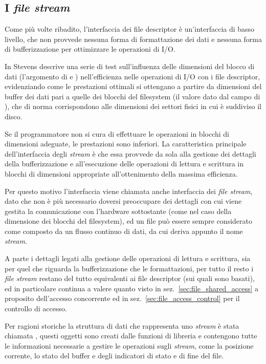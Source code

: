 \subsection{I \textit{file stream}}
\label{sec:file_stream}


Come più volte ribadito, l'interfaccia dei file descriptor è un'interfaccia di
basso livello, che non provvede nessuna forma di formattazione dei dati e
nessuna forma di bufferizzazione per ottimizzare le operazioni di I/O.

In \cite{APUE} Stevens descrive una serie di test sull'influenza delle
dimensioni del blocco di dati (l'argomento  di  e
) nell'efficienza nelle operazioni di I/O con i file descriptor,
evidenziando come le prestazioni ottimali si ottengano a partire da dimensioni
del buffer dei dati pari a quelle dei blocchi del filesystem (il valore dato
dal campo  di ), che di norma corrispondono alle
dimensioni dei settori fisici in cui è suddiviso il disco.

Se il programmatore non si cura di effettuare le operazioni in blocchi di
dimensioni adeguate, le prestazioni sono inferiori.  La caratteristica
principale dell'interfaccia degli \textit{stream} è che essa provvede da sola
alla gestione dei dettagli della bufferizzazione e all'esecuzione delle
operazioni di lettura e scrittura in blocchi di dimensioni appropriate
all'ottenimento della massima efficienza.

Per questo motivo l'interfaccia viene chiamata anche interfaccia dei
\textit{file stream}, dato che non è più necessario doversi preoccupare dei
dettagli con cui viene gestita la comunicazione con l'hardware sottostante
(come nel caso della dimensione dei blocchi del filesystem), ed un file può
essere sempre considerato come composto da un flusso continuo di dati, da cui
deriva appunto il nome \textit{stream}.

A parte i dettagli legati alla gestione delle operazioni di lettura e
scrittura, sia per quel che riguarda la bufferizzazione che le formattazioni,
per tutto il resto i \textit{file stream} restano del tutto equivalenti ai
file descriptor (sui quali sono basati), ed in particolare continua a valere
quanto visto in sez.~\ref{sec:file_shared_access} a proposito dell'accesso
concorrente ed in sez.~\ref{sec:file_access_control} per il controllo di
accesso.

Per ragioni storiche la struttura di dati che rappresenta uno \textit{stream}
è stata chiamata , questi oggetti sono creati dalle funzioni di
libreria e contengono tutte le informazioni necessarie a gestire le operazioni
sugli \textit{stream}, come la posizione corrente, lo stato del buffer e degli
indicatori di stato e di fine del file.

